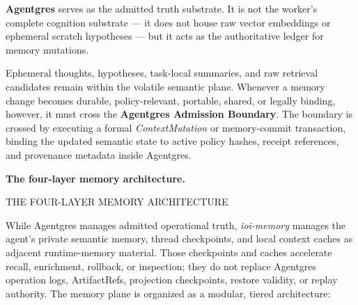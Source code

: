 \documentclass[
  11pt,
]{article}
\begin{document}
\textbf{Agentgres} serves as the admitted truth substrate. It is not the
worker's complete cognition substrate --- it does not house raw vector
embeddings or ephemeral scratch hypotheses --- but it acts as the
authoritative ledger for memory mutations.

Ephemeral thoughts, hypotheses, task-local summaries, and raw retrieval
candidates remain within the volatile semantic plane. Whenever a memory
change becomes durable, policy-relevant, portable, shared, or legally
binding, however, it must cross the \textbf{Agentgres Admission
Boundary}. The boundary is crossed by executing a formal
\emph{ContextMutation} or memory-commit transaction, binding the updated
semantic state to active policy hashes, receipt references, and
provenance metadata inside Agentgres.

\textbf{The four-layer memory architecture.}


THE FOUR-LAYER MEMORY ARCHITECTURE



\begin{center}
\end{center}

While Agentgres manages admitted operational truth, \emph{ioi-memory}
manages the agent's private semantic memory, thread checkpoints, and
local context caches as adjacent runtime-memory material. Those
checkpoints and caches accelerate recall, enrichment, rollback, or
inspection; they do not replace Agentgres operation logs, ArtifactRefs,
projection checkpoints, restore validity, or replay authority. The
memory plane is organized as a modular, tiered architecture:
\end{document}
